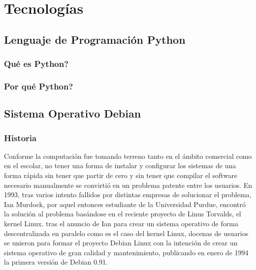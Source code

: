 \chapter[Tecnologías]{Tecnologías}
\label{Chap2}

\section{Lenguaje de Programación Python}

\subsection{Qué es Python?}

\subsection{Por qué Python?}

\newpage

\section{Sistema Operativo Debian}

\subsection{Historia}
Conforme la computación fue tomando terreno tanto en el ámbito comercial como en el escolar, no tener una forma de instalar y configurar los sistemas de una forma rápida sin tener que partir de cero y sin tener que compilar el software necesario manualmente se convirtió en un problema patente entre los usuarios.
\newline
\newline
En 1993, tras varios intento fallidos por distintas empresas de solucionar el problema, Ian Murdock, por aquel entonces estudiante de la Universidad Purdue, encontró la solución al problema basándose en el reciente proyecto de Linus Torvalds, el kernel Linux. tras el anuncio de Ian para crear un sistema operativo de forma descentralizada en paralelo como es el caso del kernel Linux, docenas de usuarios se unieron para formar el proyecto Debian Linux con la intención de crear un sistema operativo de gran calidad y mantenimiento, publicando en enero de 1994 la primera versión de Debian 0.91.

